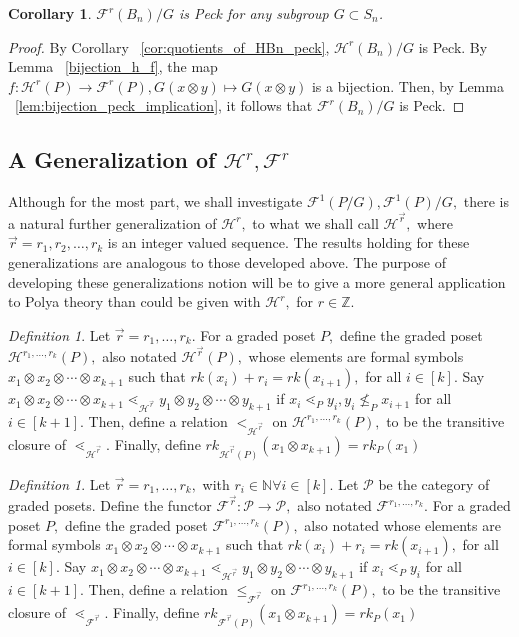 \documentclass{amsart}
\newtheorem{cor}[thm]{Corollary}
\theoremstyle{remark}
\newtheorem{defn}[thm]{Definition}
\newcommand\BN{{\mathbb N}}
\newcommand\BBZ{{\mathbb Z}}
\renewcommand{\vec}[1]{\overrightarrow{#1}}
\begin{document}
\begin{cor}
\label{cor:quotiented_edge_peck}
$\mathcal{F}^r(B_n)/G$ is Peck for any subgroup $G\subset S_n$.
\end{cor}
\begin{proof}
By Corollary ~\ref{cor:quotients_of_HBn_peck}, $\mathcal H^r(B_n)/G$ is Peck. By Lemma ~\ref{bijection_h_f}, the map $f:\mathcal H^r(P) \rightarrow \mathcal F^r(P),G(x\otimes y) \mapsto G(x\otimes y)$ is a bijection. Then, by Lemma ~\ref{lem:bijection_peck_implication}, it follows that $\mathcal F^r(B_n)/G$ is Peck.
\end{proof}

\subsection{A Generalization of $\mathcal H^r,\mathcal F^r$}
Although for the most part, we shall investigate $\mathcal F^1(P/G),\mathcal F^1(P)/G,$ there is a natural further generalization of $\mathcal H^r,$ to what we shall call $\mathcal H^{\vec r},$ where $\vec r = r_1,r_2,\ldots, r_k$ is an integer valued sequence. The results holding for these generalizations are analogous to those developed above. The purpose of developing these generalizations notion will be to give a more general application to Polya theory than could be given with $\mathcal H^r,$ for $r \in \BBZ$.

\begin{defn}
Let $\vec r = r_1,\ldots,r_k.$ For a graded poset $P,$ define the graded poset $\mathcal H^{r_1,\ldots, r_k}(P),$ also notated $\mathcal H^{\vec r}(P),$ whose elements are formal symbols $x_1 \otimes x_2 \otimes \cdots \otimes x_{k+1}$ such that $rk(x_i)+r_i = rk(x_{i+1}),$ for all $i \in [k].$ Say $x_1 \otimes x_2 \otimes \cdots \otimes x_{k+1}\lessdot_{\mathcal H^{\vec r}} y_1 \otimes y_2 \otimes \cdots \otimes y_{k+1}$ if $x_i \lessdot_P y_i,y_{i} \not \leq_P x_{i+1}$ for all $i \in [k+1].$ Then, define a relation $<_{\mathcal H^{\vec r}}$ on $\mathcal H^{r_1,\ldots, r_k}(P),$ to be the transitive closure of $\lessdot_{\mathcal H^{\vec r}}.$ Finally, define $rk_{\mathcal H^{\vec r}(P)}(x_1\otimes x_{k+1}) = rk_P(x_1)$
\end{defn}

\begin{defn}
Let $\vec r = r_1,\ldots,r_k,$ with $r_i \in \BN\forall i \in [k].$ Let $\mathcal P$ be the category of graded posets. Define the functor $\mathcal F^{\vec r}:\mathcal P \rightarrow \mathcal P,$ also notated $\mathcal F^{r_1,\ldots, r_k}.$ For a graded poset $P,$ define the graded poset $\mathcal F^{r_1,\ldots, r_k}(P),$ also notated whose elements are formal symbols $x_1 \otimes x_2 \otimes \cdots \otimes x_{k+1}$ such that $rk(x_i)+r_i = rk(x_{i+1}),$ for all $i \in [k].$ Say 
$x_1 \otimes x_2 \otimes \cdots \otimes x_{k+1}\lessdot_{\mathcal H^{\vec r}} y_1 \otimes y_2 \otimes \cdots \otimes y_{k+1}$ if $x_i \lessdot_P y_i$ for all $i \in [k+1]$. Then, define a relation $\leq_{\mathcal F^{\vec r}}$ on $\mathcal F^{r_1,\ldots, r_k}(P),$ to be the transitive closure of $\lessdot_{\mathcal F^{\vec r}}.$ Finally, define $rk_{\mathcal F^{\vec r}(P)}(x_1\otimes x_{k+1}) = rk_P(x_1)$
\end{defn}
\end{document}
